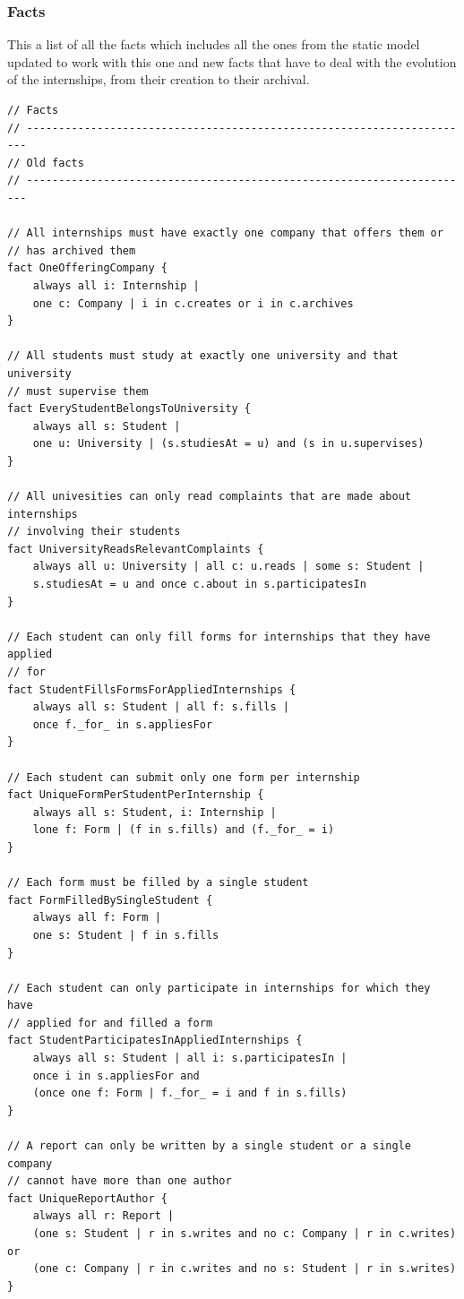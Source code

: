 \documentclass[11pt,twoside]{article}
\begin{document}
	\subsubsection{Facts}
This a list of all the facts which includes all the ones from the static model updated to work with this one and new facts that have to deal with the evolution of the internships, from their creation to their archival.
{\small
\begin{verbatim}
// Facts
// ----------------------------------------------------------------------
// Old facts
// ----------------------------------------------------------------------

// All internships must have exactly one company that offers them or
// has archived them
fact OneOfferingCompany {
    always all i: Internship |
    one c: Company | i in c.creates or i in c.archives
}

// All students must study at exactly one university and that university
// must supervise them
fact EveryStudentBelongsToUniversity {
    always all s: Student | 
    one u: University | (s.studiesAt = u) and (s in u.supervises)
}

// All univesities can only read complaints that are made about internships
// involving their students
fact UniversityReadsRelevantComplaints {
    always all u: University | all c: u.reads | some s: Student |
    s.studiesAt = u and once c.about in s.participatesIn
}

// Each student can only fill forms for internships that they have applied
// for
fact StudentFillsFormsForAppliedInternships {
    always all s: Student | all f: s.fills |
    once f._for_ in s.appliesFor
}

// Each student can submit only one form per internship
fact UniqueFormPerStudentPerInternship {
    always all s: Student, i: Internship |
    lone f: Form | (f in s.fills) and (f._for_ = i)
}

// Each form must be filled by a single student
fact FormFilledBySingleStudent {
    always all f: Form |
    one s: Student | f in s.fills
}

// Each student can only participate in internships for which they have
// applied for and filled a form
fact StudentParticipatesInAppliedInternships {
    always all s: Student | all i: s.participatesIn |
    once i in s.appliesFor and
    (once one f: Form | f._for_ = i and f in s.fills)
}

// A report can only be written by a single student or a single company
// cannot have more than one author
fact UniqueReportAuthor {
    always all r: Report |
    (one s: Student | r in s.writes and no c: Company | r in c.writes) or
    (one c: Company | r in c.writes and no s: Student | r in s.writes)
}


\end{verbatim}}
\end{document}
